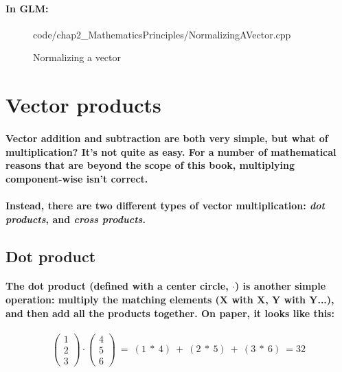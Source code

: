 \paragraph{
    In GLM:
}

\begin{frame}{}
    \begin{figure}[ht]
    \centering
    \colorbox{backgroundcolor}{
        \parbox{0.9\textwidth}{
            
            {code/chap2_MathematicsPrinciples/NormalizingAVector.cpp}
        }
    }
    \caption{Normalizing a vector}
    \label{fig:normalizing_a_vector}
    \end{figure}
\end{frame}

\section{\textsf{Vector products}}
\paragraph{
    Vector addition and subtraction are both very simple, but what of multiplication? It's not quite as easy. For a number of mathematical reasons that are beyond the scope of this book, multiplying component-wise isn't correct.
}

\paragraph{
    Instead, there are two different types of vector multiplication: \emph{dot products}, and \emph{cross products}.
}

\subsection{Dot product}
\paragraph{
    The dot product (defined with a center circle, $\cdot$) is another simple operation: multiply the matching elements (X with X, Y with Y...), and then add all the products together. On paper, it looks like this:
}

\paragraph{
    \begin{equation*}
    \begin{pmatrix}
    1\\
    2\\
    3
    \end{pmatrix} \cdot \begin{pmatrix}
    4\\
    5\\
    6
    \end{pmatrix} \ =\ ( 1\ *\ 4) \ +\ ( 2\ *\ 5) \ +\ ( 3\ *\ 6) \ =32
    \end{equation*}
}

